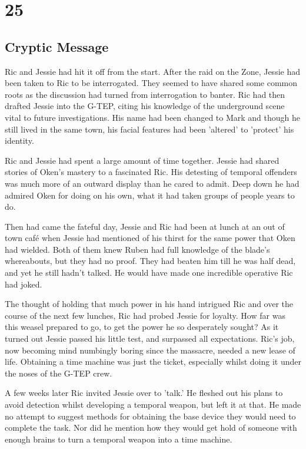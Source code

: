 \chapter{25}
\section{Cryptic Message}


Ric and Jessie had hit it off from the start.  After the raid on the Zone, Jessie had been taken to Ric to be interrogated.  They seemed to have shared some common roots as the discussion had turned from interrogation to banter.  Ric had then drafted Jessie into the G-TEP, citing his knowledge of the underground scene vital to future investigations.  His name had been changed to Mark and though he still lived in the same town, his facial features had been 'altered' to 'protect' his identity.

Ric and Jessie had spent a large amount of time together.  Jessie had shared stories of Oken's mastery to a fascinated Ric.  His detesting of temporal offenders was much more of an outward display than he cared to admit.  Deep down he had admired Oken for doing on his own, what it had taken groups of people years to do.

Then had came the fateful day, Jessie and Ric had been at lunch at an out of town café when Jessie had mentioned of his thirst for the same power that Oken had wielded.  Both of them knew Ruben had full knowledge of the blade's whereabouts, but they had no proof.  They had beaten him till he was half dead, and yet he still hadn't talked.  He would have made one incredible operative Ric had joked.

The thought of holding that much power in his hand intrigued Ric and over the course of the next few lunches, Ric had probed Jessie for loyalty.  How far was this weasel prepared to go, to get the power he so desperately sought?  As it turned out Jessie passed his little test, and surpassed all expectations.  Ric's job, now becoming mind numbingly boring since the massacre, needed a new lease of life.  Obtaining a time machine was just the ticket, especially whilst doing it under the noses of the G-TEP crew.

A few weeks later Ric invited Jessie over to 'talk.'  He fleshed out his plans to avoid detection whilst developing a temporal weapon, but left it at that.  He made no attempt to suggest methods for obtaining the base device they would need to complete the task.  Nor did he mention how they would get hold of someone with enough brains to turn a temporal weapon into a time machine.  

